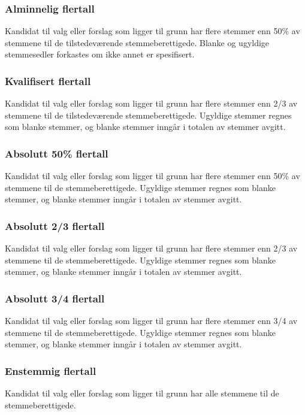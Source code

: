 \subsubsection*{Alminnelig flertall}
Kandidat til valg eller forslag som ligger til grunn har flere stemmer enn 50\% av stemmene til de tilstedeværende stemmeberettigede.
Blanke og ugyldige stemmesedler forkastes om ikke annet er spesifisert.

\subsubsection*{Kvalifisert flertall}
Kandidat til valg eller forslag som ligger til grunn har flere stemmer enn 2/3 av stemmene til de tilstedeværende stemmeberettigede.
Ugyldige stemmer regnes som blanke stemmer, og blanke stemmer inngår i totalen av stemmer avgitt.

\subsubsection*{Absolutt 50\% flertall}
Kandidat til valg eller forslag som ligger til grunn har flere stemmer enn 50\% av stemmene til de stemmeberettigede.
Ugyldige stemmer regnes som blanke stemmer, og blanke stemmer inngår i totalen av stemmer avgitt.

\subsubsection*{Absolutt 2/3 flertall}
Kandidat til valg eller forslag som ligger til grunn har flere stemmer enn 2/3 av stemmene til de stemmeberettigede.
Ugyldige stemmer regnes som blanke stemmer, og blanke stemmer inngår i totalen av stemmer avgitt.

\subsubsection*{Absolutt 3/4 flertall}
Kandidat til valg eller forslag som ligger til grunn har flere stemmer enn 3/4 av stemmene til de stemmeberettigede.
Ugyldige stemmer regnes som blanke stemmer, og blanke stemmer inngår i totalen av stemmer avgitt.

\subsubsection*{Enstemmig flertall}
Kandidat til valg eller forslag som ligger til grunn har alle stemmene til de stemmeberettigede.

